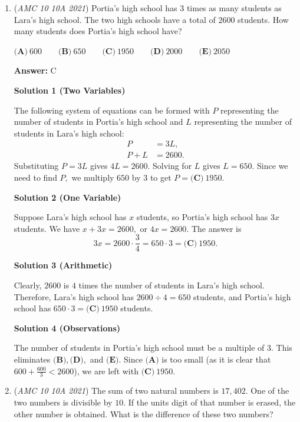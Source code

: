 \begin{enumerate}
	\item (\textit{AMC 10 10A 2021}) Portia's high school has $3$ times as many students as Lara's high school. The two high schools have a total of $2600$ students. How many students does Portia's high school have?


 $\textbf{(A)} ~600 \qquad\textbf{(B)} ~650 \qquad\textbf{(C)} ~1950 \qquad\textbf{(D)} ~2000\qquad\textbf{(E)} ~2050$

 \textbf{Answer: }C



\textbf{Solution 1 (Two Variables)}

The following system of equations can be formed with $P$ representing the number of students in Portia's high school and $L$ representing the number of students in Lara's high school:
 \begin{align*} P&=3L, \\ P+L&=2600. \end{align*}
Substituting $P=3L$ gives $4L=2600.$ Solving for $L$ gives $L=650.$ Since we need to find $P,$ we multiply $650$ by $3$ to get $P=\boxed{\textbf{(C)} ~1950}.$




\textbf{Solution 2 (One Variable)}

Suppose Lara's high school has $x$ students, so Portia's high school has $3x$ students. We have $x+3x=2600,$ or $4x=2600.$ The answer is 
 \[3x=2600\cdot\frac 34=650\cdot3=\boxed{\textbf{(C)} ~1950}.\]




\textbf{Solution 3 (Arithmetic)}

Clearly, $2600$ is $4$ times the number of students in Lara's high school. Therefore, Lara's high school has $2600\div4=650$ students, and Portia's high school has $650\cdot3=\boxed{\textbf{(C)} ~1950}$ students.

 



\textbf{Solution 4 (Observations)}

The number of students in Portia's high school must be a multiple of $3.$ This eliminates $\textbf{(B)},\textbf{(D)},$ and $\textbf{(E)}.$ Since $\textbf{(A)}$ is too small (as it is clear that $600+\frac{600}{3}<2600$), we are left with $\boxed{\textbf{(C)} ~1950}.$



	\item (\textit{AMC 10 10A 2021}) The sum of two natural numbers is $17{,}402$. One of the two numbers is divisible by $10$. If the units digit of that number is erased, the other number is obtained. What is the difference of these two numbers?



\end{enumerate}
